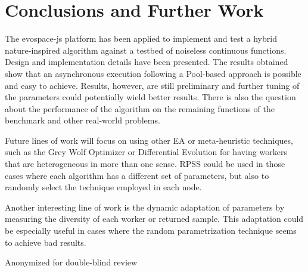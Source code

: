 \section{Conclusions and Further Work}
\label{sec:conclusions}

The {\sf evospace-js} platform has been applied to implement 
and test a hybrid nature-inspired algorithm against a testbed 
of noiseless continuous functions. Design and implementation 
details have been presented.  The results obtained show that 
an asynchronous execution following a Pool-based approach is 
possible and easy to achieve. Results, however, are still 
preliminary and further tuning of the parameters could 
potentially wield better results. There is also the question about
the performance of the algorithm on the remaining functions
of the benchmark and other real-world problems. 

Future lines of work will focus on using other EA or 
meta-heuristic techniques, such as the Grey Wolf Optimizer \cite{mirjalili2014grey}
or Differential Evolution \cite{storn1997differential} for having workers that are 
heterogeneous in more than one sense. RPSS could be used 
in those cases where each algorithm has a different set of 
parameters, but also to randomly select the technique employed 
in each node.

Another interesting line of work is the dynamic 
adaptation of parameters by measuring the diversity of each 
worker or returned sample. This adaptation could be especially 
useful in cases where the random parametrization technique 
seems to achieve bad results. 

\begin{acks}
  Anonymized for double-blind review
\end{acks}
